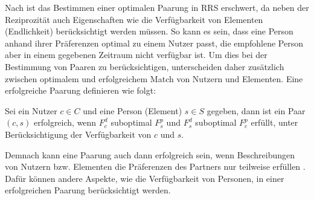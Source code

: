 Nach \textcite[S. 36]{li:inproceedings} ist das Bestimmen einer optimalen Paarung in \ac{RRS} erschwert, da neben der Reziprozität auch Eigenschaften wie die Verfügbarkeit von Elementen (Endlichkeit) berücksichtigt werden müssen.
So kann es sein, dass eine Person anhand ihrer Präferenzen optimal zu einem Nutzer passt, die empfohlene Person aber in einem gegebenen Zeitraum nicht verfügbar ist.
Um dies bei der Bestimmung von Paaren zu berücksichtigen, unterscheiden \textcite[S. 37]{li:inproceedings} daher zusätzlich zwischen optimalem und erfolgreichem Match von Nutzern und Elementen.
Eine erfolgreiche Paarung definieren \textcite[S. 37]{li:inproceedings} wie folgt:

\begin{definition}\label{def:2}
    Sei ein Nutzer $c \in C$ und eine Person (Element) $s \in S$ gegeben, dann ist ein Paar $(c,s)$ erfolgreich, wenn $F_{c}^{d}$ suboptimal $F_{s}^{p}$ und $F_{s}^{d}$ suboptimal $F_{c}^{p}$ erfüllt, unter Berücksichtigung der Verfügbarkeit von $c$ und $s$.
\end{definition}

Demnach kann eine Paarung auch dann erfolgreich sein, wenn Beschreibungen von Nutzern bzw. Elementen die Präferenzen des Partners nur teilweise erfüllen \cite[S. 37]{li:inproceedings}.
Dafür können andere Aspekte, wie die Verfügbarkeit von Personen, in einer erfolgreichen Paarung berücksichtigt werden.


